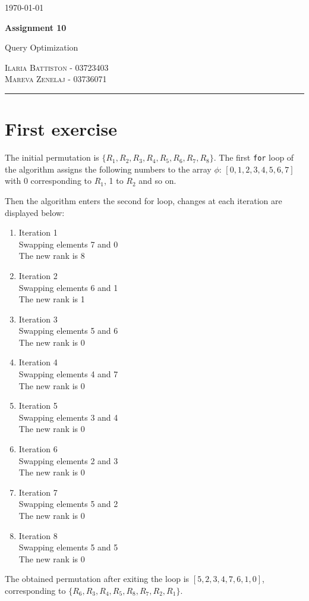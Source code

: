 \documentclass[12pt]{article}
\begin{document}
	
	
	\begin{flushright}
		\today
	\end{flushright}
	{\Large \textbf{Assignment 10}}
	
	{\large Query Optimization}
	
	\textsc{Ilaria Battiston - 03723403} \\
	\textsc{Mareva Zenelaj - 03736071}
	
	\rule{\linewidth}{0.5pt}
	
	\section{First exercise}
	The initial permutation is $\{R_1, R_2, R_3, R_4, R_5, R_6, R_7, R_8\}$. The first \texttt{for} loop of the algorithm assigns the following numbers to the array $\phi$: $[0, 1, 2, 3, 4, 5, 6, 7]$ with 0 corresponding to $R_1$, 1 to $R_2$ and so on.
	
	Then the algorithm enters the second for loop, changes at each iteration are displayed below:
	\begin{enumerate}
		\item Iteration  1
\\
		Swapping elements 7 and 0
\\
		The new rank is 8
		\item Iteration  2
\\
		Swapping elements 6 and 1
\\
		The new rank is 1
		\item Iteration  3
\\
		Swapping elements 5 and 6
\\
		The new rank is 0
		\item Iteration  4
\\
		Swapping elements 4 and 7
\\
		The new rank is 0
		\item Iteration  5
\\
		Swapping elements 3 and 4
\\
		The new rank is 0
		\item Iteration  6
\\
		Swapping elements 2 and 3
\\
		The new rank is 0
		\item Iteration  7
\\
		Swapping elements 5 and 2
\\
		The new rank is 0
		\item Iteration  8
\\
		Swapping elements 5 and 5
\\
		The new rank is 0
	\end{enumerate}
	The obtained permutation after exiting the loop is $[5, 2, 3, 4, 7, 6, 1, 0]$, corresponding to $\{R_6, R_3, R_4, R_5, R_8, R_7, R_2, R_1\}$.
	
\end{document}
